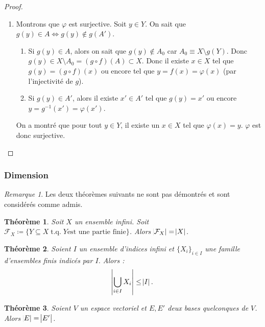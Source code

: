 \documentclass{article}
\DeclareMathOperator{\tq}{\text{ t.q. }}
\newtheorem{thm}{Théorème}[section]
\theoremstyle{definition}
\theoremstyle{remark}
\newtheorem*{rmq}{Remarque}
\begin{document}
\begin{proof}
\begin{enumerate}
			\item Montrons que $\varphi$ est surjective. Soit $y \in Y$. On sait que $g(y) \in A \iff g(y) \not \in g(A')$.
			\begin{enumerate}
				\item Si $g(y) \in A$, alors on sait que $g(y) \not \in A_0$ car $A_0 \equiv X \setminus g(Y)$. Donc $g(y) \in X \setminus A_0 = (g \circ f)(A) \subset X$.
				Donc il existe $x \in X$ tel que $g(y) = (g \circ f)(x)$ ou encore tel que $y = f(x) = \varphi(x)$ (par l'injectivité de $g$).
				\item Si $g(y) \in A'$, alors il existe $x' \in A'$ tel que $g(y) = x'$ ou encore $y = g^{-1}(x') = \varphi(x')$.
			\end{enumerate}
			On a montré que pour tout $y \in Y$, il existe un $x \in X$ tel que $\varphi(x) = y$. $\varphi$ est donc surjective.
		\end{enumerate}
		\end{proof}
	
		\subsubsection{Dimension}
		\begin{rmq} Les deux théorèmes suivants ne sont pas démontrés et sont considérés comme admis. \end{rmq}
		
		\begin{thm}\label{cardPartiesFinies} Soit $X$ un ensemble infini. Soit $\mathcal F_X \coloneqq \{Y \subseteq X \tq Y \text {est une partie finie}\}$.
		Alors $\abs {\mathcal F_X} = \abs X$. \end{thm}

		\begin{thm}\label{unionEnsFinisIndicésInfini} Soient $I$ un ensemble d'indices infini et $\{X_i\}_{i \in I}$ une famille d'ensembles finis indicés par $I$. Alors :
		\[\abs {\bigcup_{i \in I}X_i} \leq \abs I.\] \end{thm}
		
		\begin{thm} Soient $V$ un espace vectoriel et $E, E'$ deux bases quelconques de $V$. Alors $\abs E = \abs {E'}$. \end{thm}
\end{document}
